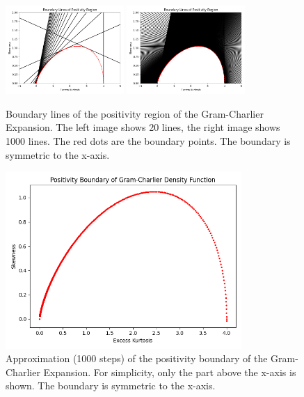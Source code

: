 \begin{figure}[h]
    \centering
    \includegraphics[width=0.4\textwidth]{img/gc_positivity_boundary_lines_20.png}
    \includegraphics[width=0.4\textwidth]{img/gc_positivity_boundary_lines_1000.png}
    \caption{Boundary lines of the positivity region of the Gram-Charlier Expansion. The left image shows 20 lines, the right image shows 1000 lines. The red dots are the boundary points. The boundary is symmetric to the x-axis.}
    \label{fig:gram_charlier_boundary_lines_20_vs_1000}
\end{figure}

\begin{figure}[h]
    \centering
    \includegraphics[width=0.8\textwidth]{img/gc_positivity_boundary.png}
    \caption{Approximation (1000 steps) of the positivity boundary of the Gram-Charlier Expansion. For simplicity, only the part above the x-axis is shown. The boundary is symmetric to the x-axis.}
    \label{fig:gram_charlier_boundary}
\end{figure}

